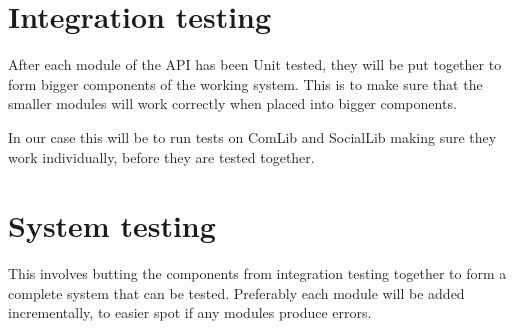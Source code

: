 \section{Integration testing}
After each module of the API has been Unit tested, they will be put together to form bigger components 
of the working system. This is to make sure that the smaller modules will work correctly when placed 
into bigger components. 

In our case this will be to run tests on ComLib and SocialLib making sure they work individually, 
before they are tested together.

\section{System testing}
This involves butting the components from integration testing together to form a complete system that 
can be tested. Preferably each module will be added incrementally, to easier spot if any modules produce errors.